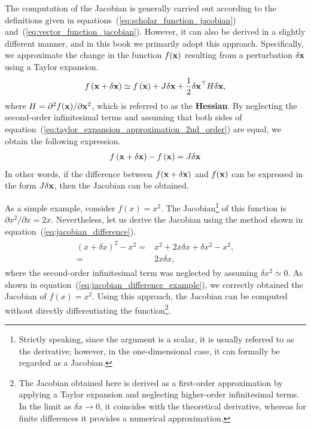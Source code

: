 The computation of the Jacobian is generally carried out according to the definitions given in equations~(\ref{eq:scholar_function_jacobian}) and~(\ref{eq:vector_function_jacobian}).
However, it can also be derived in a slightly different manner, and in this book we primarily adopt this approach.
Specifically, we approximate the change in the function $f({\bf x})$ resulting from a perturbation $\delta {\bf x}$ using a Taylor expansion.
%
\begin{align}
  f \left( {\bf x} + \delta {\bf x} \right) \simeq
  f \left( {\bf x} \right) + 
  J \delta {\bf x} + 
  \frac{1}{2} \delta {\bf x}^{\top} H \delta {\bf x},
  \label{eq:taylor_expansion_approximation_2nd_order}
\end{align}
%
where $H = \partial^{2} f({\bf x}) / \partial {\bf x}^{2}$, which is referred to as the {\bf Hessian}.
By neglecting the second-order infinitesimal terms and assuming that both sides of equation~(\ref{eq:taylor_expansion_approximation_2nd_order}) are equal, we obtain the following expression.
%
\begin{align}
  f \left( {\bf x} + \delta {\bf x} \right) - f \left( {\bf x} \right) = J \delta {\bf x}
  \label{eq:jacobian_difference}
\end{align}
%
In other words, if the difference between $f({\bf x} + \delta {\bf x})$ and $f({\bf x})$ can be expressed in the form $J \delta {\bf x}$, then the Jacobian can be obtained.

As a simple example, consider $f(x) = x^{2}$.
The Jacobian\footnote{Strictly speaking, since the argument is a scalar, it is usually referred to as the derivative; however, in the one-dimensional case, it can formally be regarded as a Jacobian.} of this function is $\partial x^{2} / \partial x = 2x$.
Nevertheless, let us derive the Jacobian using the method shown in equation~(\ref{eq:jacobian_difference}).
%
\begin{align}
  \begin{split}
    (x + \delta x)^{2} - x^{2}
    = & x^{2} + 2 x \delta x + \delta x^{2} - x^{2}, \\
    = & 2 x \delta x,
  \end{split}
  \label{eq:jacobian_difference_example}
\end{align}
%
where the second-order infinitesimal term was neglected by assuming $\delta x^{2} \simeq 0$.
As shown in equation~(\ref{eq:jacobian_difference_example}), we correctly obtained the Jacobian of $f(x) = x^{2}$.
Using this approach, the Jacobian can be computed without directly differentiating the function\footnote{The Jacobian obtained here is derived as a first-order approximation by applying a Taylor expansion and neglecting higher-order infinitesimal terms. In the limit as $\delta x \to 0$, it coincides with the theoretical derivative, whereas for finite differences it provides a numerical approximation.}.














